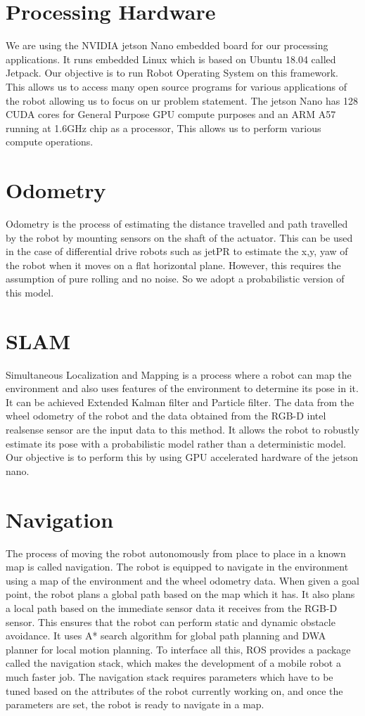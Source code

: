 \documentclass{article}
\begin{document}
\section{Processing Hardware}
We are using the NVIDIA jetson Nano embedded board for our processing applications. It runs embedded Linux which is based on Ubuntu 18.04 called Jetpack. Our objective is to run Robot Operating System on this framework. This allows us to access many open source programs for various applications of the robot allowing us to focus on ur problem statement. The jetson Nano has 128 CUDA cores for General Purpose GPU compute purposes and an ARM A57 running at 1.6GHz chip as a processor, This allows us to perform various compute operations.

\section{Odometry}
Odometry is the process of estimating the distance travelled and path travelled by the robot
by mounting sensors on the shaft of the actuator.  This can be used in the case of differential drive robots such as jetPR to estimate the x,y, yaw of the robot when it moves on a flat horizontal plane. However, this requires the assumption of pure rolling and no noise.  So we adopt a probabilistic version of this model.

\section{SLAM}
Simultaneous Localization and Mapping is a process where a robot can map the environment and also uses features of the environment to determine its pose in it. It can be achieved Extended Kalman filter and Particle filter. The data from the wheel odometry of the robot and the data obtained from the RGB-D intel realsense sensor are the input data to this method. It allows the robot to robustly estimate its pose with a probabilistic model rather than a deterministic model. Our objective is to perform this by using GPU accelerated hardware of the jetson nano.

\section{Navigation}
The process of moving the robot autonomously from place to place in a known map is called navigation. The robot is equipped to navigate in the environment using a map of the environment and the wheel odometry data. When given a goal point, the robot plans a global path based on the map which it has. It also plans a local path based on the immediate sensor data it receives from the RGB-D sensor. This ensures that the robot can perform static and dynamic obstacle avoidance. It uses A* search algorithm for global path planning and DWA planner for local motion planning. To interface all this, ROS provides a package called the navigation stack, which makes the development of a mobile robot a much faster job. The navigation stack requires parameters which have to be tuned based on the attributes of the robot currently working on, and once the parameters are set, the robot is ready to navigate in a map.


\end{document}
